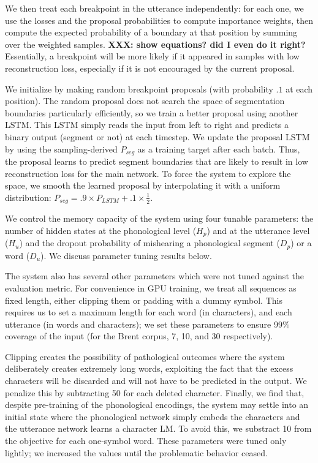 \documentclass[11pt,letterpaper]{article}
\newcommand{\xxx}[1]{\textbf{\color{red}XXX: #1}}
\begin{document}
We then treat each breakpoint in the utterance independently: for each
one, we use the losses and the proposal probabilities to compute
importance weights, then compute the expected probability of a
boundary at that position by summing over the weighted
samples. \xxx{show equations?  did I even do it right?} Essentially,
a breakpoint will be more likely if it appeared in samples
with low reconstruction loss, especially if it is not encouraged by
the current proposal.

We initialize by making random breakpoint proposals (with probability
$.1$ at each position). The random proposal does not search the space
of segmentation boundaries particularly efficiently, so we train a
better proposal using another LSTM. This LSTM simply reads the input
from left to right and predicts a binary output (segment or not) at
each timestep. We update the proposal LSTM by using the
sampling-derived $P_{seg}$ as a training target after each
batch. Thus, the proposal learns to predict segment boundaries that
are likely to result in low reconstruction loss for the main
network. To force the system to explore the space, we smooth the
learned proposal by interpolating it with a uniform distribution:
$P_{seg} = .9 \times P_{LSTM} + .1 \times \frac{1}{2}$.

We control the memory capacity of the system using four tunable
parameters: the number of hidden states at the phonological level
($H_p$) and at the utterance level ($H_u$) and the dropout probability
of mishearing a phonological segment ($D_p$) or a word ($D_u$). We
discuss parameter tuning results below.

The system also has several other parameters which were not tuned
against the evaluation metric. For convenience in GPU training, we
treat all sequences as fixed length, either clipping them or padding
with a dummy symbol. This requires us to set a maximum length for each
word (in characters), and each utterance (in words and characters); we
set these parameters to ensure 99\% coverage of the input (for the
Brent corpus, 7, 10, and 30 respectively).

Clipping creates the possibility of pathological outcomes where the
system deliberately creates extremely long words, exploiting the fact
that the excess characters will be discarded and will not have to be
predicted in the output. We penalize this by subtracting 50 for each
deleted character. Finally, we find that, despite pre-training of the
phonological encodings, the system may settle into an initial state
where the phonological network simply embeds the characters and the
utterance network learns a character LM. To avoid this, we substract
10 from the objective for each one-symbol word. These parameters were
tuned only lightly; we increased the values until the problematic
behavior ceased.
\end{document}
